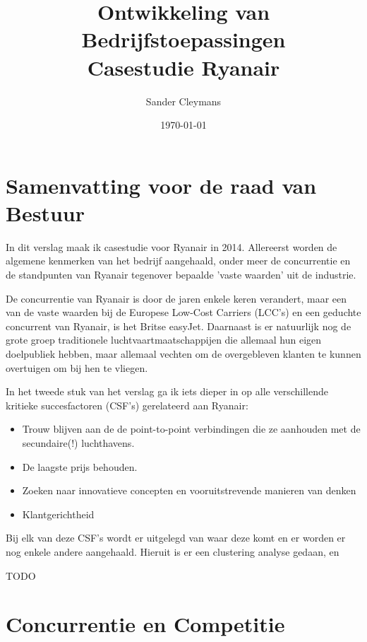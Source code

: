 \documentclass{article}
\author{Sander Cleymans}
\date{\today}
\title{Ontwikkeling van Bedrijfstoepassingen \\
		Casestudie Ryanair}
\begin{document}
 

\maketitle

\newpage  

\tableofcontents

\newpage
\part{Samenvatting voor de raad van Bestuur}

In dit verslag maak ik casestudie voor Ryanair in 2014.
Allereerst worden de algemene kenmerken van het bedrijf aangehaald, onder meer de concurrentie en de standpunten van Ryanair tegenover bepaalde 'vaste waarden' uit de industrie.
   
De concurrentie van Ryanair is door de jaren enkele keren verandert, maar een van de vaste waarden bij de Europese Low-Cost Carriers (LCC's) en een geduchte concurrent van Ryanair, is het Britse easyJet. Daarnaast is er natuurlijk nog de grote groep traditionele luchtvaartmaatschappijen die allemaal hun eigen doelpubliek hebben, maar allemaal vechten om de overgebleven klanten te kunnen overtuigen om bij hen te vliegen.
	
In het tweede stuk van het verslag ga ik iets dieper in op alle verschillende kritieke succesfactoren (CSF's) gerelateerd aan Ryanair:

\begin{itemize}
\item Trouw blijven aan de de point-to-point verbindingen die ze aanhouden met de secundaire(!) luchthavens.
\item De laagste prijs behouden.
\item Zoeken naar innovatieve concepten en vooruitstrevende manieren van denken
\item Klantgerichtheid
\end{itemize}

Bij elk van deze CSF's wordt er uitgelegd van waar deze komt en er worden er nog enkele andere aangehaald.
Hieruit is er een clustering analyse gedaan, en 

\begin{center}
\begin{Huge}
TODO
\end{Huge}
\end{center} 

\newpage
\part{Concurrentie en Competitie}
\end{document}
